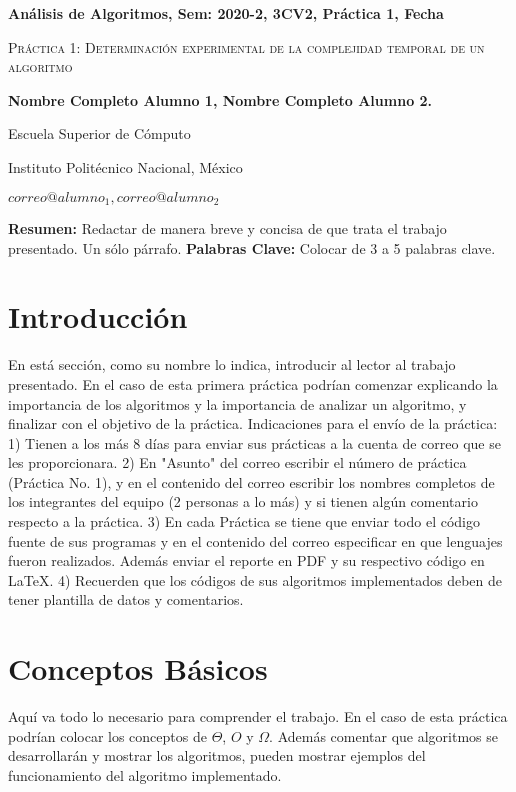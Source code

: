 \documentclass[12pt,twoside]{article}
\date{}
\begin{document}
\centerline{\bf An\'alisis de Algoritmos, Sem: 2020-2, 3CV2, Pr\'actica 1, Fecha}
\centerline{}
\centerline{}
\begin{center}
\Large{\textsc{Pr\'actica 1: Determinaci\'on experimental de la complejidad temporal de un
algoritmo}}
\end{center}
\centerline{}
\centerline{\bf {Nombre Completo Alumno 1, Nombre Completo Alumno 2.}}
\centerline{}
\centerline{Escuela Superior de C\'omputo}
\centerline{Instituto Polit\'ecnico Nacional, M\'exico}
\centerline{$correo@alumno_1, correo@alumno_2$}
\newtheorem{Theorem}{\quad Theorem}[section]
\newtheorem{Definition}[Theorem]{\quad Definition}
\newtheorem{Corollary}[Theorem]{\quad Corollary}
\newtheorem{Lemma}[Theorem]{\quad Lemma}
\newtheorem{Example}[Theorem]{\quad Example}
\bigskip
\textbf{Resumen:} Redactar de manera breve y concisa de que trata el trabajo presentado. Un
s\'olo p\'arrafo.
{\bf Palabras Clave:} Colocar de 3 a 5 palabras clave.
\section{Introducci\'on}
En est\'a secci\'on, como su nombre lo indica, introducir al lector al trabajo presentado. En el
caso de esta primera pr\'actica podr\'ian comenzar explicando la importancia de los algoritmos y
la importancia de analizar un algoritmo, y finalizar con el objetivo de la pr\'actica.
Indicaciones para el env\'io de la pr\'actica: 1) Tienen a los m\'as 8 d\'ias para enviar sus
pr\'acticas a la cuenta de correo que se les proporcionara. 2) En "Asunto" del correo escribir 
el n\'umero de pr\'actica (Pr\'actica No. 1), y en el contenido del correo escribir los nombres
completos de los integrantes del equipo (2 personas a lo m\'as) y si tienen alg\'un comentario
respecto a la pr\'actica. 3) En cada Pr\'actica se tiene que enviar todo el c\'odigo fuente de
sus programas y en el contenido del correo especificar en que lenguajes fueron realizados.
Adem\'as enviar el reporte en PDF y su respectivo c\'odigo en LaTeX. 4) Recuerden que los
c\'odigos de sus algoritmos implementados deben de tener plantilla de datos y comentarios.
\section{Conceptos B\'asicos}
Aqu\'i va todo lo necesario para comprender el trabajo. En el caso de esta pr\'actica podr\'ian
colocar los conceptos de $\Theta$, $O$ y $\Omega$. Adem\'as comentar que algoritmos se
desarrollar\'an y mostrar los algoritmos, pueden mostrar ejemplos del funcionamiento del
algoritmo implementado.
\end{document}
